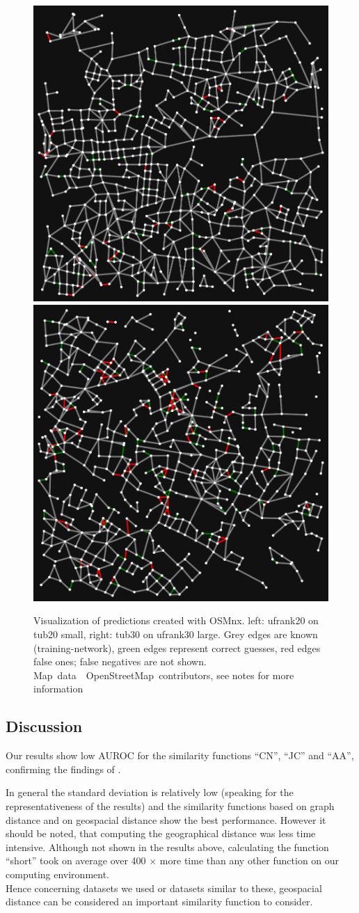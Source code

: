 \documentclass[12pt,a4paper]{IEEEtran}
\newcommand{\osmattribute}[1][]{\mbox{#1 \textrm{\textcopyright} OpenStreetMap contributors}}
\begin{document}
\begin{figure}[tb]
\centering
\includegraphics[width=.485\columnwidth]{graphics/tub_random_forest_classifier_cross_small.pdf}%
\hfill%
\includegraphics[width=.485\columnwidth]{graphics/ufrank_random_forest_classifier_cross_30_large.pdf}
\caption{Visualization of predictions created with OSMnx. left: ufrank20 on tub20 small, right: tub30 on ufrank30 large.
Grey edges are known (training-network), green edges represent correct guesses, red edges false ones; false negatives are not shown.
\osmattribute[Map data], see notes for more information}
\label{fig:classifier_predictions}
\end{figure}

\subsection{Discussion}

Our results show low AUROC for the similarity functions \enquote{CN}, \enquote{JC} and \enquote{AA},
confirming the findings of \citeauthor{road_link_prediction_subgraph}.~\cite[see][20]{road_link_prediction_subgraph}

In general the standard deviation is relatively low (speaking for the representativeness of the results)
and the similarity functions based on graph distance and on geospacial distance show the best performance.
However it should be noted, that computing the geographical distance was less time intensive.
Although not shown in the results above, calculating the function \enquote{short}
took on average over 400 \(\times\) more time than any other function on our computing environment.\\
Hence concerning datasets we used or datasets similar to these,
geospacial distance can be considered an important similarity function to consider.
\end{document}
